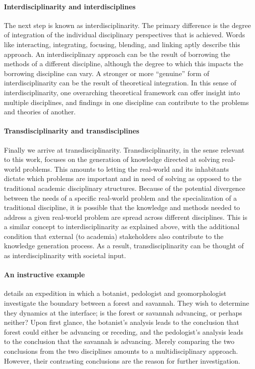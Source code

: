 \documentclass[a4paper]{article}
\begin{document}
\paragraph{Interdisciplinarity and interdisciplines}

The next step is known as interdisciplinarity. The primary difference is the
degree of integration of the individual disciplinary perspectives that is
achieved. Words like interacting, integrating, focusing, blending, and linking
aptly describe this approach. An interdisciplinary approach can be the result
of borrowing the methods of a different discipline, although the degree to
which this impacts the borrowing discipline can vary. A stronger or more
``genuine'' form of interdisciplinarity can be the result of theoretical
integration. In this sense of interdisciplinarity, one overarching theoretical
framework can offer insight into multiple disciplines, and findings in one
discipline can contribute to the problems and theories of another.

\paragraph{Transdisciplinarity and transdisciplines}

Finally we arrive at transdisciplinarity. Transdisciplinarity, in the sense
relevant to this work, focuses on the generation of knowledge directed at
solving real-world problems. This amounts to letting the real-world and its
inhabitants dictate which problems are important and in need of solving as
opposed to the traditional academic disciplinary structures. Because of the
potential divergence between the needs of a specific real-world problem and
the specialization of a traditional discipline, it is possible that the
knowledge and methods needed to address a given real-world problem are spread
across different disciplines. This is a similar concept to interdisciplinarity
as explained above, with the additional condition that external (to academia)
stakeholders also contribute to the knowledge generation process. As a result,
transdisciplinarity can be thought of as interdisciplinarity with societal
input. 

\paragraph{An instructive example}

\cite{latour1999circulating} details an expedition in which a botanist,
pedologist and geomorphologist investigate the boundary between a forest and
savannah. They wish to determine they dynamics at the interface; is the forest
or savannah advancing, or perhaps neither? Upon first glance, the botanist's
analysis leads to the conclusion that forest could either be advancing or
receding, and the pedologist's analysis leads to the conclusion that the
savannah is advancing.  Merely comparing the two conclusions from the two
disciplines amounts to a multidisciplinary approach. However, their
contrasting conclusions are the reason for further investigation.
\end{document}
